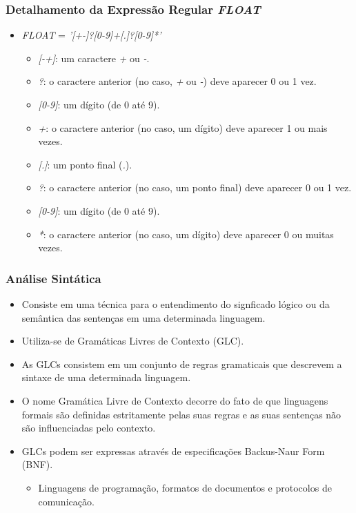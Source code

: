\documentclass[aspectratio=169]{beamer}
\begin{document}
{  \begin{frame}
    \frametitle{Detalhamento da Expressão Regular \emph{FLOAT}}
    \begin{itemize}
      \item \emph{FLOAT} = \emph{'[+-]?[0-9]+[.]?[0-9]*'}
        \begin{itemize}
          \item \emph{[-+]}: um caractere \emph{+} ou \emph{-}.
          \item \emph{?}: o caractere anterior (no caso, \emph{+} ou \emph{-}) deve aparecer 0 ou 1 vez.
          \item \emph{[0-9]}: um dígito (de 0 até 9).
          \item \emph{+}: o caractere anterior (no caso, um dígito) deve aparecer 1 ou mais vezes.
          \item \emph{[.]}: um ponto final (\emph{.}).
          \item \emph{?}: o caractere anterior (no caso, um ponto final) deve aparecer 0 ou 1 vez.
          \item \emph{[0-9]}: um dígito (de 0 até 9).
          \item \emph{*}: o caractere anterior (no caso, um dígito) deve aparecer 0 ou muitas vezes.
      \end{itemize}
    \end{itemize}
\end{frame}


\begin{frame}
  \frametitle{Análise Sintática}

  \begin{itemize}
    \item Consiste em uma técnica para o entendimento do signficado lógico
          ou da semântica das sentenças em uma determinada linguagem.
    \item Utiliza-se de Gramáticas Livres de Contexto (GLC).
    \item As GLCs consistem em um conjunto de regras gramaticais que 
          descrevem a sintaxe de uma determinada linguagem.
    \item O nome Gramática Livre de Contexto decorre do fato de que 
          linguagens formais s\~ao definidas estritamente pelas suas 
          regras e as suas senten\c cas n\~ao s\~ao influenciadas pelo 
          contexto.
    \item GLCs podem ser expressas através de especificações Backus-Naur 
          Form (BNF).
          \begin{itemize}
            \item Linguagens de programação, formatos de documentos e 
                  protocolos de comunicação.
          \end{itemize}
  \end{itemize}


\end{frame}}
\end{document}
